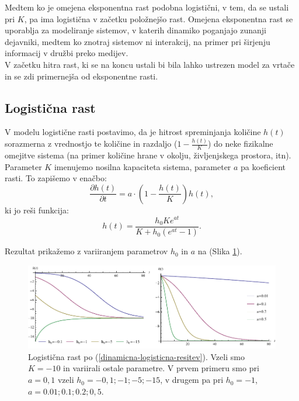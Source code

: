 \documentclass[a4paper, twoside, 12pt]{book}
\begin{document}
    Medtem ko je omejena eksponentna rast podobna logistični, v tem, da se ustali pri $K$, pa ima logistična v začetku položnejšo rast. Omejena eksponentna rast se uporablja za modeliranje sistemov, v katerih dinamiko poganjajo zunanji dejavniki, medtem ko znotraj sistemov ni interakcij, na primer pri širjenju informacij v družbi preko medijev.\\
V začetku hitra rast, ki se na koncu ustali bi bila lahko ustrezen model za vrtače in se zdi primernejša od eksponentne rasti.


\subsection{Logistična rast}

V modelu logistične rasti postavimo, da je hitrost spreminjanja količine $h(t)$ sorazmerna z vrednostjo te količine in razdaljo ($1 - \frac{h(t)}{K}$) do neke fizikalne omejitve sistema (na primer količine hrane v okolju, življenjskega prostora, itn). Parameter $K$ imenujemo nosilna kapaciteta sistema, parameter $a$ pa koeficient rasti. To zapišemo v enačbo:
    \begin{equation}
      \frac{\partial h(t)}{\partial t} = a \cdot \left( 1 - \frac{h(t)}{K} \right) h(t),
      \label{dinamicna-logisticna}
    \end{equation}
ki jo reši funkcija:
    \begin{equation}
      h(t) = \frac{h_0 K e^{a t}}{K + h_0 (e^{a t}-1)}.
      \label{dinamicna-logisticna-resitev}
    \end{equation}

Rezultat prikažemo z variiranjem parametrov $h_0$ in $a$ na (Slika \ref{fig:logisticna-rast}).
    \begin{figure}[h]
      \begin{center}
        \includegraphics[width=14cm]{slike/logisticna-rast}
      \end{center}
      \caption{Logistična rast po (\ref{dinamicna-logisticna-resitev}). Vzeli smo $K=-10$ in variirali ostale parametre. V prvem primeru smo pri $a=0,1$ vzeli $h_0=-0,1;-1;-5;-15$, v drugem pa pri $h_0=-1$, $a=0.01;0.1;0.2;0,5$.}
      \label{fig:logisticna-rast}
    \end{figure}
\end{document}
